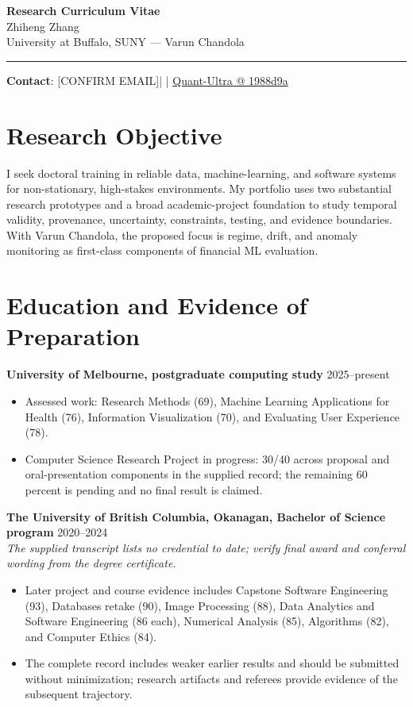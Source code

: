 \documentclass[11pt]{article}
\makeatletter
\newcommand{\ApplicantName}{Zhiheng Zhang}
\newcommand{\ApplicantEmail}{[CONFIRM EMAIL]}
\newcommand{\ApplicantPhone}{[CONFIRM PHONE]}
\newcommand{\ApplicantGitHub}{\href{https://github.com/zhiheng-zhang-Mera/Quant-Ultra/tree/1988d9a8530da91a8158de864d098ea869098923}{Quant-Ultra @ 1988d9a}}
\makeatother
\begin{document}
\begin{center}
{\LARGE\bfseries Research Curriculum Vitae}\\[0.25em]
{\large \ApplicantName}\\
University at Buffalo, SUNY --- Varun Chandola
\end{center}
\vspace{0.35em}\hrule\vspace{0.65em}

\textbf{Contact}: \ApplicantEmail\quad | \quad \ApplicantPhone\quad | \quad \ApplicantGitHub

\section*{Research Objective}
I seek doctoral training in reliable data, machine-learning, and software systems for non-stationary, high-stakes environments. My portfolio uses two substantial research prototypes and a broad academic-project foundation to study temporal validity, provenance, uncertainty, constraints, testing, and evidence boundaries. With Varun Chandola, the proposed focus is regime, drift, and anomaly monitoring as first-class components of financial ML evaluation.

\section*{Education and Evidence of Preparation}
\textbf{University of Melbourne, postgraduate computing study} \hfill 2025--present
\begin{itemize}
\item Assessed work: Research Methods (69), Machine Learning Applications for Health (76), Information Visualization (70), and Evaluating User Experience (78).
\item Computer Science Research Project in progress: 30/40 across proposal and oral-presentation components in the supplied record; the remaining 60 percent is pending and no final result is claimed.
\end{itemize}

\textbf{The University of British Columbia, Okanagan, Bachelor of Science program} \hfill 2020--2024\\
\textit{The supplied transcript lists no credential to date; verify final award and conferral wording from the degree certificate.}
\begin{itemize}
\item Later project and course evidence includes Capstone Software Engineering (93), Databases retake (90), Image Processing (88), Data Analytics and Software Engineering (86 each), Numerical Analysis (85), Algorithms (82), and Computer Ethics (84).
\item The complete record includes weaker earlier results and should be submitted without minimization; research artifacts and referees provide evidence of the subsequent trajectory.
\end{itemize}
\end{document}
